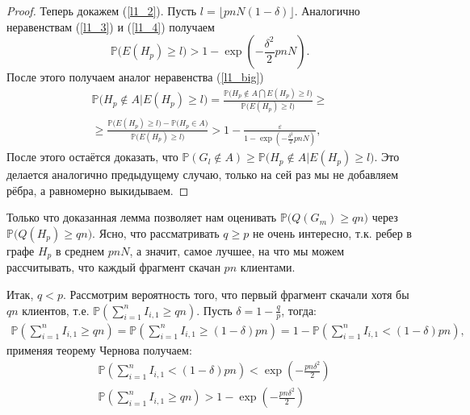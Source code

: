 \documentclass{matmex-diploma-custom}
\newcommand{\PRob}{\mathbb P}
\newcommand{\geqs}{\geqslant}
\newcommand{\eps}{\varepsilon}
\theoremstyle{named}
\begin{document}
\begin{proof}
Теперь докажем (\ref{l1_2}). Пусть $l = \lfloor pnN(1-\delta) \rfloor$. Аналогично неравенствам (\ref{l1_3}) и (\ref{l1_4}) получаем
\begin{equation} \label{l1_5}
\PRob\big( E(H_p) \geqs l \big) > 1 - \exp\left(-\frac{\delta^2}{2}pnN\right).
\end{equation}
После этого получаем аналог неравенства (\ref{l1_big})
\begin{equation}\label{l1_big2}
\begin{aligned}
	\PRob\Big( H_p \not\in A \big| E(H_p) \geqs l \Big)
=
	\frac{
		\PRob\Big( H_p \not\in A \bigcap E(H_p) \geqs l \Big)
	}{
		\PRob\big(E(H_p) \geqs l \big)
	} 
\geqs
\\
\geqs
	\frac{
		\PRob\big(E(H_p) \geqs l \big) 
			-
		\PRob\big(H_p \in A \big)
	}{
		\PRob\big(E(H_p) \geqs l\big)
	}
>
	1
		-
	\frac{\eps}{
		1 - \exp\left(-\frac{\delta^2}{2}pnN\right)
	},
\end{aligned}\end{equation}
После этого остаётся доказать, что $\PRob(G_l \not\in A) \geqs \PRob\Big( H_p \not\in A \big| E(H_p) \geqs l \Big)$.
Это делается аналогично предыдущему случаю, только на сей раз мы не добавляем рёбра, а равномерно выкидываем.
\end{proof}

\bigskip

Только что доказанная лемма позволяет нам оценивать $\PRob\big(Q(G_m) \geqs qn\big)$ через $\PRob\big(Q(H_p) \geqs q n\big)$.
Ясно, что рассматривать $q \geqs p$ не очень интересно, т.к. ребер в графе $H_p$ в среднем $pnN$, 
а значит, самое лучшее, на что мы можем рассчитывать, что каждый фрагмент скачан $pn$ клиентами.

Итак, $q < p$. Рассмотрим вероятность того, что первый фрагмент скачали хотя бы $qn$ клиентов, 
т.е. $\PRob\left(\sum\limits_{i=1}^n I_{i,1} \geqs qn\right)$. Пусть $\delta = 1 - \frac{q}{p}$, тогда:
\begin{align*}
\PRob\left(\sum_{i=1}^n I_{i,1} \geqs qn\right) = \PRob\left(\sum_{i=1}^n I_{i,1} \geqs (1 - \delta) pn\right) 
= 1 - \PRob\left(\sum_{i=1}^n I_{i,1} < (1 - \delta) pn\right),
\end{align*}
применяя теорему Чернова получаем:
\begin{align}
&\PRob\left(\sum_{i=1}^n I_{i,1} < (1 - \delta) pn\right) < \exp\left(- \frac{pn \delta^2}{2} \right)
\\
&\PRob\left(\sum_{i=1}^n I_{i,1} \geqs qn\right) > 1 - \exp\left(- \frac{pn \delta^2}{2} \right)
\end{align}
\end{document}
